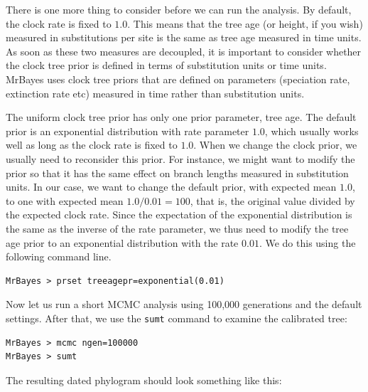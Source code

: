 \documentclass[12pt]{book}
\newcommand{\ttt}[1]{\texttt{#1}}
\begin{document}
There is one more thing to consider before we can run the analysis. By default, the clock rate is
fixed to $1.0$. This means that the tree age (or height, if you wish) measured in substitutions per
site is the same as tree age measured in time units. As soon as these two measures are decoupled,
it is important to consider whether the clock tree prior is defined in terms of substitution units
or time units. MrBayes uses clock tree priors that are defined on parameters (speciation rate,
extinction rate etc) measured in time rather than substitution units.

The uniform clock tree prior has only one prior parameter, tree age. The default prior is an
exponential distribution with rate parameter $1.0$, which usually works well as long as the clock
rate is fixed to $1.0$. When we change the clock prior, we usually need to reconsider this prior.
For instance, we might want to modify the prior so that it has the same effect on branch lengths
measured in substitution units. In our case, we want to change the default prior, with expected
mean $1.0$, to one with expected mean $1.0 / 0.01 = 100$, that is, the original value divided by
the expected clock rate. Since the expectation of the exponential distribution is the same as the
inverse of the rate parameter, we thus need to modify the tree age prior to an exponential
distribution with the rate $0.01$. We do this using the following command line.

\small
\begin{singlespacing}
\begin{verbatim}
MrBayes > prset treeagepr=exponential(0.01)
\end{verbatim}
\end{singlespacing}
\normalsize

Now let us run a short MCMC analysis using 100,000 generations and the default settings. After
that, we use the \ttt{sumt} command to examine the calibrated tree:

\small
\begin{singlespacing}
\begin{verbatim}
MrBayes > mcmc ngen=100000
MrBayes > sumt
\end{verbatim}
\end{singlespacing}
\normalsize

The resulting dated phylogram should look something like this:
\end{document}
